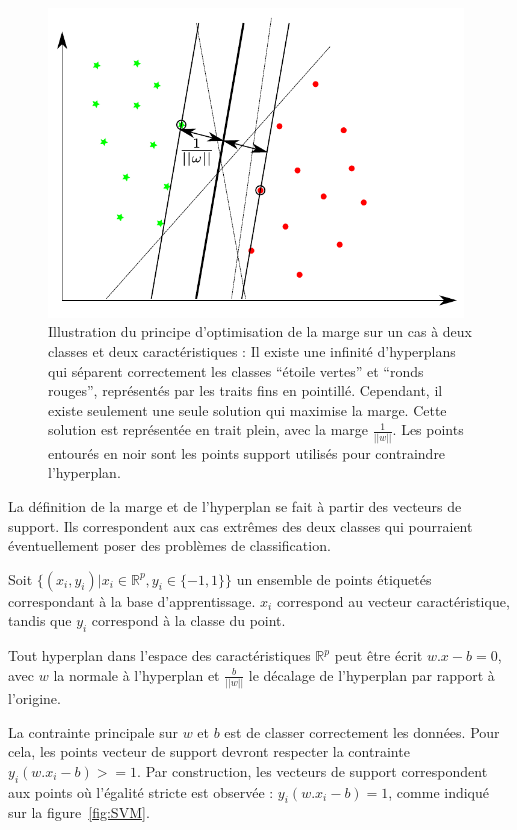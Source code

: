 \begin{figure}[h]
	\label{fig:multiPlansSeparationSVM}
	\begin{center}
	\includegraphics[width=11cm]{images/multiPlansSeparationSVM}
	\end{center}
	\caption[Illustration du principe d'optimisation de la marge sur le SVM]{Illustration du principe d'optimisation de la marge sur un cas à deux classes et deux caractéristiques : Il existe une infinité d'hyperplans qui séparent correctement les classes ``étoile vertes'' et ``ronds rouges'', représentés par les traits fins en pointillé. Cependant, il existe seulement une seule solution qui maximise la marge. Cette solution est représentée en trait plein, avec la marge $\frac{1}{||w||}$. Les points entourés en noir sont les points support utilisés pour contraindre l'hyperplan. }
\end{figure}


La définition de la marge et de l'hyperplan se fait à partir des vecteurs de support. Ils correspondent aux cas extrêmes des deux classes qui pourraient éventuellement poser des problèmes de classification.


Soit $\{(x_i, y_i) | x_i \in \mathbb{R}^p , y_i \in \{ -1, 1 \} \}$ un ensemble de points étiquetés correspondant à la base d'apprentissage. $x_i$ correspond au vecteur caractéristique, tandis que $y_i$ correspond à la classe du point.

Tout hyperplan dans l'espace des caractéristiques $\mathbb{R}^p$ peut être écrit $w . x - b = 0$, avec $w$ la normale à l'hyperplan et $\frac{b}{ ||w|| }$ le décalage de l'hyperplan par rapport à l'origine. 

La contrainte principale sur $w$ et $b$ est de classer correctement les données. Pour cela, les points vecteur de support devront respecter la contrainte $y_i ( w . x_i - b ) >= 1$. Par construction, les vecteurs de support correspondent aux points où l'égalité stricte est observée : $y_i ( w . x_i - b ) = 1$, comme indiqué sur la figure~\ref{fig:SVM}.

